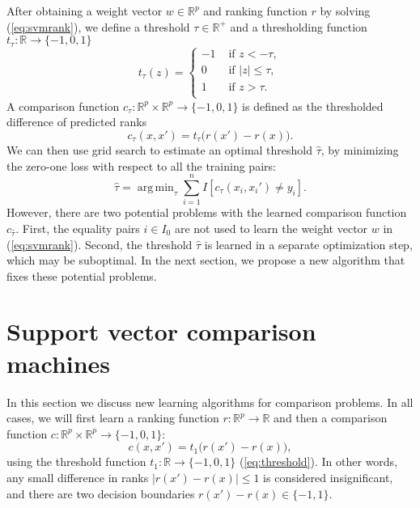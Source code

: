 \documentclass{article}
\newcommand{\RR}{\mathbb R}
\DeclareMathOperator*{\argmin}{arg\,min}
\begin{document}
After obtaining a weight vector $w\in\RR^p$ and ranking
function $r$ by solving (\ref{eq:svmrank}), we define a threshold
$\tau\in\RR^+$ and a thresholding function
$t_\tau:\RR\rightarrow\{-1,0,1\}$
\begin{equation}
  \label{eq:threshold}
  t_\tau(z) = 
  \begin{cases}
    -1 & \text{ if } z < -\tau, \\
    0 & \text{ if } |z| \leq \tau, \\
    1 & \text{ if } z > \tau. \\
  \end{cases}
\end{equation}
A comparison function $c_\tau:\RR^p\times \RR^p\rightarrow \{-1, 0,
1\}$ is defined as the thresholded difference of predicted ranks
\begin{equation}
  \label{eq:svmrank_c_t}
  c_\tau(x, x') = 
  t_\tau\big(
  r(x') - r(x)
  \big).
\end{equation}
We can then use grid search to estimate an optimal threshold $\hat
\tau$, by minimizing the zero-one loss with respect to all the
training pairs:
\begin{equation}
  \hat \tau = \argmin_{\tau}
  \sum_{i=1}^n
  I\left[ c_\tau(x_i, x_i') \neq y_i \right].
\end{equation}
However, there are two potential problems with the learned comparison
function $c_{\hat\tau}$. First, the equality pairs $i\in I_0$ are not
used to learn the weight vector $w$ in (\ref{eq:svmrank}). Second, the
threshold $\hat \tau$ is learned in a separate optimization step, which
may be suboptimal. In the next section, we propose a new algorithm
that fixes these potential problems.
\section{Support vector comparison machines}
\label{sec:svm-compare}

In this section we discuss new learning algorithms for comparison
problems. In all cases, we will first learn a ranking function
$r:\RR^p\rightarrow\RR$ and then a comparison function $c:\RR^p\times
\RR^p\rightarrow\{-1,0,1\}$:
\begin{equation}
  \label{eq:compare_general}
  c(x,x')=t_1\big( r(x') - r(x) \big),
\end{equation}
using the threshold
function $t_1:\RR\rightarrow\{-1,0,1\}$ (\ref{eq:threshold}). 
In other
words, any small difference in ranks $|r(x')-r(x)|\leq 1$ is considered
insignificant, and there are two decision boundaries
$r(x')-r(x)\in\{-1,1\}$.
\end{document}
